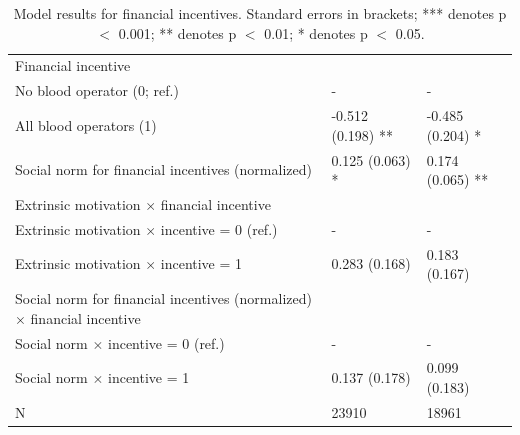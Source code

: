 \documentclass[AER]{AEA}
\begin{document}
\begin{table}[hbt!]
\begin{tabular}{p{8cm}|l|p{3cm}}
Financial incentive &  & \\ 
\hspace{0.7cm} No blood operator (0; ref.) & - & -\\ 
\hspace{0.7cm} All blood operators (1) & -0.512 (0.198) ** & -0.485 (0.204) *\\ 
Social norm for financial incentives (normalized) & 0.125 (0.063) * & 0.174 (0.065) **\\ 
Extrinsic motivation $\times$ financial incentive &  & \\ 
\hspace{0.7cm} Extrinsic motivation $\times$ incentive = 0 (ref.) & - & -\\ 
\hspace{0.7cm} Extrinsic motivation $\times$ incentive = 1 & 0.283 (0.168) & 0.183 (0.167)\\ 
Social norm for financial incentives (normalized) $\times$ financial incentive &  & \\ 
\hspace{0.7cm} Social norm $\times$ incentive = 0 (ref.) & - & -\\ 
\hspace{0.7cm} Social norm $\times$ incentive = 1 & 0.137 (0.178) & 0.099 (0.183)\\ 
N & 23910 & 18961
    \end{tabular}
    \caption{Model results for financial incentives. Standard errors in brackets; *** denotes p $<$ 0.001; ** denotes p $<$ 0.01; * denotes p $<$ 0.05.}
    \label{tab:model_financial}
\end{table}
\end{document}
